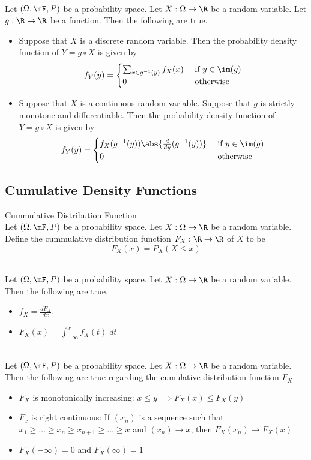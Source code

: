 \documentclass[a4paper]{article}
\begin{document}
\begin{prp}{}{}\\
Let $(\Omega,\mF,P)$ be a probability space. Let $X:\Omega\to\R$ be a random variable. Let $g:\R\to\R$ be a function. Then the following are true. 
\begin{itemize}
\item Suppose that $X$ is a discrete random variable. Then the probability density function of $Y=g\circ X$ is given by $$f_Y(y)=
\begin{cases}
\sum_{x\in g^{-1}(y)}f_X(x) & \text{ if }y\in\im(g)\\
0 & \text{ otherwise }
\end{cases}$$
\item Suppose that $X$ is a continuous random variable. Suppose that $g$ is strictly monotone and differentiable.  Then the probability density function of $Y=g\circ X$ is given by $$f_Y(y)=\begin{cases}
f_X(g^{-1}(y))\abs{\frac{d}{dy}(g^{-1}(y))} & \text{ if }y\in\im(g)\\
0 & \text{ otherwise }
\end{cases}$$
\end{itemize}
\end{prp}

\subsection{Cumulative Density Functions}
\begin{defn}{Cummulative Distribution Function}{}\\
Let $(\Omega,\mF,P)$ be a probability space. Let $X:\Omega\to\R$ be a random variable. Define the cummulative distribution function $F_X:\R\to\R$ of $X$ to be $$F_X(x)=P_X(X\leq x)$$
\end{defn}

\begin{prp}{}{}\\
Let $(\Omega,\mF,P)$ be a probability space. Let $X:\Omega\to\R$ be a random variable. Then the following are true. 
\begin{itemize}
\item $f_X=\frac{dF_X}{dx}$. 
\item $F_X(x)=\int_{-\infty}^xf_X(t)\;dt$
\end{itemize}
\end{prp}

\begin{prp}{}{}\\
Let $(\Omega,\mF,P)$ be a probability space. Let $X:\Omega\to\R$ be a random variable. Then the following are true regarding the cumulative distribution function $F_X$. 
\begin{itemize}
\item $F_X$ is monotonically increasing: $x\leq y\implies F_X(x)\leq F_X(y)$
\item $F_x$ is right continuous: If $(x_n)$ is a sequence such that $x_1\geq\dots\geq x_n\geq x_{n+1}\geq\dots\geq x$ and $(x_n)\to x$, then $F_X(x_n)\to F_X(x)$
\item $F_X(-\infty)=0$ and $F_X(\infty)=1$
\end{itemize}
\end{prp}
\end{document}
